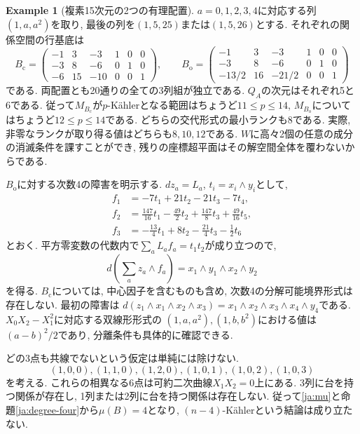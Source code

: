 \documentclass[12pt]{amsart}
\newcommand{\egword}{Example}
\theoremstyle{definition}
\newtheorem{eg}[thm]{\egword}
\theoremstyle{remark}
\numberwithin{equation}{section}
\begin{document}
\begin{eg}[複素15次元の2つの有理配置]\label{ja:examples}
$a=0,1,2,3,4$に対応する列$(1,a,a^2)$を取り,
最後の列を$(1,5,25)$または$(1,5,26)$とする.
それぞれの関係空間の行基底は
\[
 B_{\mathrm c}=\begin{pmatrix}
 -1&3&-3&1&0&0\\-3&8&-6&0&1&0\\-6&15&-10&0&0&1
 \end{pmatrix},\qquad
 B_{\mathrm o}=\begin{pmatrix}
 -1&3&-3&1&0&0\\-3&8&-6&0&1&0\\-13/2&16&-21/2&0&0&1
 \end{pmatrix}
\]
である. 両配置とも20通りの全ての3列組が独立である.
$Q_A$の次元はそれぞれ5と6である.
従って$M_{B_{\mathrm c}}$が$p$-K\"ahlerとなる範囲はちょうど$11\leq p\leq14$,
$M_{B_{\mathrm o}}$についてはちょうど$12\leq p\leq14$である.
どちらの交代形式の最小ランクも8である.
実際, 非零なランクが取り得る値はどちらも$8,10,12$である.
$W$に高々2個の任意の成分の消滅条件を課すことができ,
残りの座標超平面はその解空間全体を覆わないからである.
\end{eg}

$B_{\mathrm o}$に対する次数4の障害を明示する.
$dz_a=L_a$, $t_i=x_i\wedge y_i$として,
\begin{align*}
 f_1&=-7t_1+21t_2-21t_3-7t_4,\\
 f_2&=\tfrac{147}{16}t_1-\tfrac{49}{2}t_2
                +\tfrac{147}{8}t_3+\tfrac{49}{16}t_5,\\
 f_3&=-\tfrac{13}{4}t_1+8t_2-\tfrac{21}{4}t_3-\tfrac12t_6
\end{align*}
とおく. 平方零変数の代数内で$\sum_a L_a f_a=t_1t_2$が成り立つので,
\begin{equation}\label{ja:explicit-boundary}
 d\left(\sum_a z_a\wedge f_a\right)=x_1\wedge y_1\wedge x_2\wedge y_2
\end{equation}
を得る. $B_{\mathrm c}$については, 中心因子を含むものも含め,
次数4の分解可能境界形式は存在しない.
最初の障害は
$d(z_1\wedge x_1\wedge x_2\wedge x_3)
=x_1\wedge x_2\wedge x_3\wedge x_4\wedge y_4$である.
$X_0X_2-X_1^2$に対応する双線形形式の
$(1,a,a^2),(1,b,b^2)$における値は$(a-b)^2/2$であり,
分離条件も具体的に確認できる.

どの3点も共線でないという仮定は単純には除けない.
\[
 (1,0,0),(1,1,0),(1,2,0),(1,0,1),(1,0,2),(1,0,3)
\]
を考える. これらの相異なる6点は可約二次曲線$X_1X_2=0$上にある.
3列に台を持つ関係が存在し, 1列または2列に台を持つ関係は存在しない.
従って\eqref{ja:mu}と命題\ref{ja:degree-four}から$\mu(B)=4$となり,
$(n-4)$-K\"ahlerという結論は成り立たない.
\end{document}
